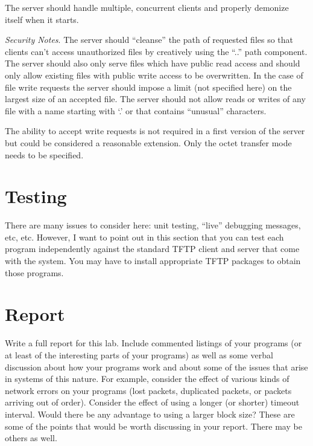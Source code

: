 \documentclass[twocolumn]{article}
\begin{document}
The server should handle multiple, concurrent clients and properly demonize itself when it
starts.

\textit{Security Notes}. The server should ``cleanse'' the path of requested files so that
clients can't access unauthorized files by creatively using the ``..'' path component. The
server should also only serve files which have public read access and should only allow existing
files with public write access to be overwritten. In the case of file write requests the server
should impose a limit (not specified here) on the largest size of an accepted file. The server
should not allow reads or writes of any file with a name starting with `.' or that contains
``unusual'' characters.

The ability to accept write requests is not required in a first version of the server but could
be considered a reasonable extension. Only the octet transfer mode needs to be specified.

\section{Testing}

There are many issues to consider here: unit testing, ``live'' debugging messages, etc, etc.
However, I want to point out in this section that you can test each program independently
against the standard TFTP client and server that come with the system. You may have to install
appropriate TFTP packages to obtain those programs.

\section{Report}

Write a full report for this lab. Include commented listings of your programs (or at least of
the interesting parts of your programs) as well as some verbal discussion about how your
programs work and about some of the issues that arise in systems of this nature. For example,
consider the effect of various kinds of network errors on your programs (lost packets,
duplicated packets, or packets arriving out of order). Consider the effect of using a longer (or
shorter) timeout interval. Would there be any advantage to using a larger block size? These are
some of the points that would be worth discussing in your report. There may be others as well.
\end{document}
